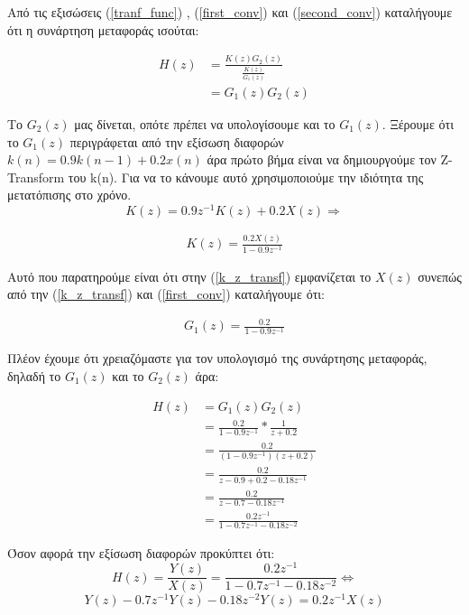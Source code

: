 \documentclass[11pt]{article}
\begin{document}
\par \noindent
Από τις εξισώσεις (\ref{tranf_func}) , (\ref{first_conv}) και (\ref{second_conv}) καταλήγουμε ότι η συνάρτηση μεταφοράς ισούται:

\begin{align}
    H(z)&=\frac{K(z)G_2(z)}{\frac{K(z)}{G_1(z)}} \nonumber \\ 
        &=\boxed{G_1(z)G_2(z)} \label{tranf_func_final}
\end{align}

\par \noindent
Το $G_2(z)$ μας δίνεται, οπότε πρέπει να υπολογίσουμε και το $G_1(z)$. Ξέρουμε ότι το $G_1(z)$ περιγράφεται από την εξίσωση διαφορών $k(n) = 0.9k(n-1)+0.2x(n)$ άρα πρώτο βήμα είναι να δημιουργούμε τον Z-Transform του k(n). Για να το κάνουμε αυτό χρησιμοποιούμε την ιδιότητα της μετατόπισης στο χρόνο.
\[ K(z)=0.9z^{-1}K(z)+0.2X(z) \Rightarrow \]

\begin{align}
    \boxed{K(z)=\frac{0.2X(z)}{1-0.9z^{-1}}} \label{k_z_transf}
\end{align}

\par \noindent
Αυτό που παρατηρούμε είναι ότι στην (\ref{k_z_transf}) εμφανίζεται το $X(z)$ συνεπώς από την (\ref{k_z_transf}) και (\ref{first_conv}) καταλήγουμε ότι:

\begin{align}
    \boxed{G_1(z)=\frac{0.2}{1-0.9z^{-1}}} \label{g_1}
\end{align}

\par \noindent
Πλέον έχουμε ότι χρειαζόμαστε για τον υπολογισμό της συνάρτησης μεταφοράς, δηλαδή το $G_1(z)$ και το $G_2(z)$ άρα:

\begin{align}
    H(z)&=G_1(z)G_2(z) \nonumber \\
    &=\frac{0.2}{1-0.9z^{-1}}*\frac{1}{z+0.2} \nonumber \\
    &=\frac{0.2}{(1-0.9z^{-1})(z+0.2)} \nonumber \\
    &=\frac{0.2}{z-0.9+0.2-0.18z^{-1}} \nonumber \\
    &=\frac{0.2}{z-0.7-0.18z^{-1}} \nonumber \\
    &=\boxed{\frac{0.2z^{-1}}{1-0.7z^{-1}-0.18z^{-2}}}
\end{align}

\par \noindent
Όσον αφορά την εξίσωση διαφορών προκύπτει ότι:
\[ H(z)=\frac{Y(z)}{X(z)}=\frac{0.2z^{-1}}{1-0.7z^{-1}-0.18z^{-2}} \Leftrightarrow \]
\[ Y(z) - 0.7z^{-1}Y(z) -0.18z^{-2}Y(z) = 0.2z^{-1}X(z) \]
\end{document}
